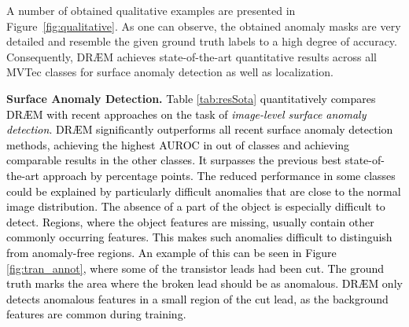 \documentclass[10pt,twocolumn,letterpaper]{article}
\newcommand\ntxt[1]{\textcolor{black}{#1}}
\newcommand\ntext[1]{\textcolor{black}{#1}}
\begin{document}
A number of obtained qualitative examples are presented in Figure~\ref{fig:qualitative}. As one can observe, the obtained anomaly masks are very detailed and resemble the given ground truth labels to a high degree of accuracy. Consequently, DR{\AE}M achieves state-of-the-art quantitative results across all MVTec classes for surface anomaly detection as well as localization. 

\textbf{Surface Anomaly Detection.} 
\ntext{Table \ref{tab:resSota} quantitatively compares DR{\AE}M with recent approaches on the task of \emph{image-level surface anomaly detection}.}
\ntxt{DR{\AE}M significantly outperforms all recent surface anomaly detection methods, achieving the highest AUROC in  out of  classes and achieving comparable results in the other classes. It surpasses the previous best state-of-the-art approach by  percentage points. The reduced performance in some classes could be explained by particularly difficult anomalies that are close to the normal image distribution. The absence of a part of the object is especially difficult to detect. Regions, where the object features are missing, usually contain other commonly occurring features. This makes such anomalies difficult to distinguish from anomaly-free regions. An example of this can be seen in Figure \ref{fig:tran_annot}, where some of the transistor leads had been cut. The ground truth marks the area where the broken lead should be as anomalous. DR{\AE}M only detects anomalous features in a small region of the cut lead, as the background features are common during training.}
\end{document}
